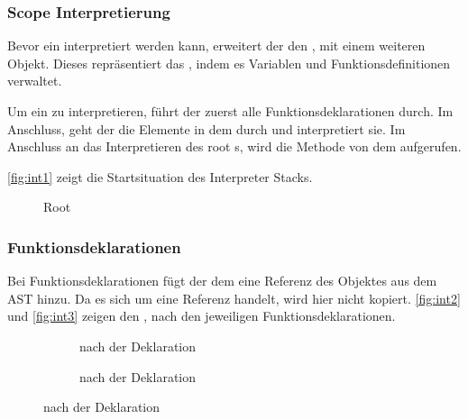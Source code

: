 {    \subsubsection{Scope Interpretierung}
    \label{sssec:Scope Interpretierung}
      Bevor ein  interpretiert werden kann, erweitert der  den , mit einem weiteren  Objekt. Dieses repräsentiert das , indem es Variablen und Funktionsdefinitionen verwaltet.

      Um ein  zu interpretieren, führt der  zuerst alle Funktionsdeklarationen durch. Im Anschluss, geht der  die  Elemente in dem  durch und interpretiert sie. Im Anschluss an das Interpretieren des root s, wird die  Methode von dem  aufgerufen.

      \autoref{fig:int1} zeigt die Startsituation des Interpreter Stacks.
      \begin{figure}[H]
        \centering
        \caption{Root }
        \label{fig:int1}
      \end{figure}

    \subsubsection{Funktionsdeklarationen}
    \label{sssec:Funktionsdeklarationen}
      Bei Funktionsdeklarationen fügt der  dem  eine Referenz des  Objektes aus dem AST hinzu. Da es sich um eine Referenz handelt, wird hier nicht kopiert. \autoref{fig:int2} und \autoref{fig:int3} zeigen den , nach den jeweiligen Funktionsdeklarationen.
      \begin{figure}[H]
        \vspace*{-\baselineskip}
        \centering
        \begin{minipage}{.45\linewidth}
            \begin{figure}[H]
              \centering
              \caption{ nach der  Deklaration}
              \label{fig:int2}
            \end{figure}
        \end{minipage}%
        \begin{minipage}{.45\linewidth}
          \begin{figure}[H]
            \centering
            \caption{ nach der  Deklaration}
            \label{fig:int3}
          \end{figure}
        \end{minipage}
      \end{figure}


}
